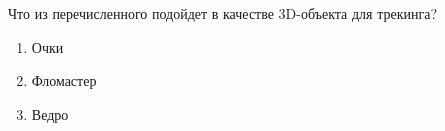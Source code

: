 
Что из перечисленного подойдет в качестве 3D-объекта для трекинга?


\begin{enumerate}
    \item Очки
    \item Фломастер
    \item Ведро
\end{enumerate}